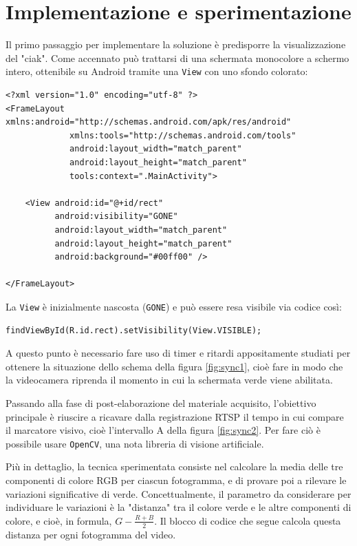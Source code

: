 \section{Implementazione e sperimentazione}
\label{sec:sync_impl}

Il primo passaggio per implementare la soluzione è predisporre la visualizzazione del "ciak". Come accennato può trattarsi di una schermata monocolore a schermo intero, ottenibile su Android tramite una \texttt{View} con uno sfondo colorato:

\begin{verbatim}
<?xml version="1.0" encoding="utf-8" ?>
<FrameLayout xmlns:android="http://schemas.android.com/apk/res/android"
             xmlns:tools="http://schemas.android.com/tools"
             android:layout_width="match_parent"
             android:layout_height="match_parent"
             tools:context=".MainActivity">

    <View android:id="@+id/rect"
          android:visibility="GONE"
          android:layout_width="match_parent"
          android:layout_height="match_parent"
          android:background="#00ff00" />

</FrameLayout>
\end{verbatim}

La \texttt{View} è inizialmente nascosta (\texttt{GONE}) e può essere resa visibile via codice così:

\begin{verbatim}
findViewById(R.id.rect).setVisibility(View.VISIBLE);
\end{verbatim}

A questo punto è necessario fare uso di timer e ritardi appositamente studiati per ottenere la situazione dello schema della figura \ref{fig:sync1}, cioè fare in modo che la videocamera riprenda il momento in cui la schermata verde viene abilitata.

Passando alla fase di post-elaborazione del materiale acquisito, l'obiettivo principale è riuscire a ricavare dalla registrazione RTSP il tempo in cui compare il marcatore visivo, cioè l'intervallo A della figura \ref{fig:sync2}. Per fare ciò è possibile usare \texttt{OpenCV}, una nota libreria di visione artificiale.

Più in dettaglio, la tecnica sperimentata consiste nel calcolare la media delle tre componenti di colore RGB per ciascun fotogramma, e di provare poi a rilevare le variazioni significative di verde. Concettualmente, il parametro da considerare per individuare le variazioni è la "distanza" tra il colore verde e le altre componenti di colore, e cioè, in formula, $G - \frac{R+B}{2}$. Il blocco di codice che segue calcola questa distanza per ogni fotogramma del video. 

